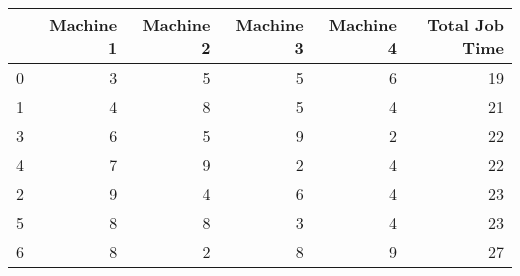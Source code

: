 \begin{tabular}{lrrrrr}
\toprule
 & Machine 1 & Machine 2 & Machine 3 & Machine 4 & Total Job Time \\
\midrule
0 & 3 & 5 & 5 & 6 & 19 \\
1 & 4 & 8 & 5 & 4 & 21 \\
3 & 6 & 5 & 9 & 2 & 22 \\
4 & 7 & 9 & 2 & 4 & 22 \\
2 & 9 & 4 & 6 & 4 & 23 \\
5 & 8 & 8 & 3 & 4 & 23 \\
6 & 8 & 2 & 8 & 9 & 27 \\
\bottomrule
\end{tabular}
